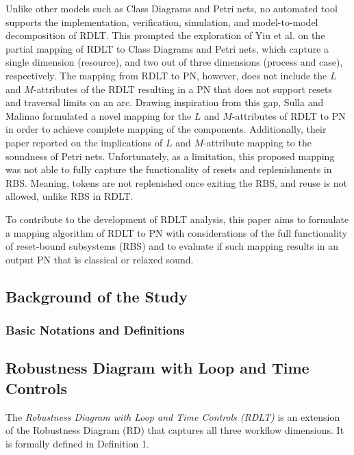 \documentclass[12pt]{article}
\begin{document}
    Unlike other models such as Class Diagrams and Petri nets, no automated tool supports the implementation, verification, simulation, and model-to-model decomposition of RDLT. This prompted the exploration of Yiu et al. \cite{yiu} on the partial mapping of RDLT to Class Diagrams and Petri nets, which capture a single dimension (resource), and two out of three dimensions (process and case), respectively. The mapping from RDLT to PN, however, does not include the $L$ and $M$-attributes of the RDLT resulting in a PN that does not support resets and traversal limits on an arc. Drawing inspiration from this gap, Sulla and Malinao \cite{sulla-malinao} formulated a novel mapping for the $L$ and $M$-attributes of RDLT to PN in order to achieve complete mapping of the components. Additionally, their paper reported on the implications of $L$ and $M$-attribute mapping to the soundness of Petri nets. Unfortunately, as a limitation, this proposed mapping was not able to fully capture the functionality of resets and replenishments in RBS. Meaning, tokens are not replenished once exiting the RBS, and reuse is not allowed, unlike RBS in RDLT. \par

    To contribute to the development of RDLT analysis, this paper aims to formulate a mapping algorithm of RDLT to PN with considerations of the full functionality of reset-bound subsystems (RBS) and to evaluate if such mapping results in an output PN that is classical or relaxed sound.

    \subsection{Background of the Study}
    \subsubsection{Basic Notations and Definitions}
    \subsection*{Robustness Diagram with Loop and Time Controls}
    The \textit{Robustness Diagram with Loop and Time Controls (RDLT)} is an extension of the Robustness Diagram (RD) that captures all three workflow dimensions. It is formally defined in Definition 1.

    \newtheorem{definition}{Definition}
\end{document}
